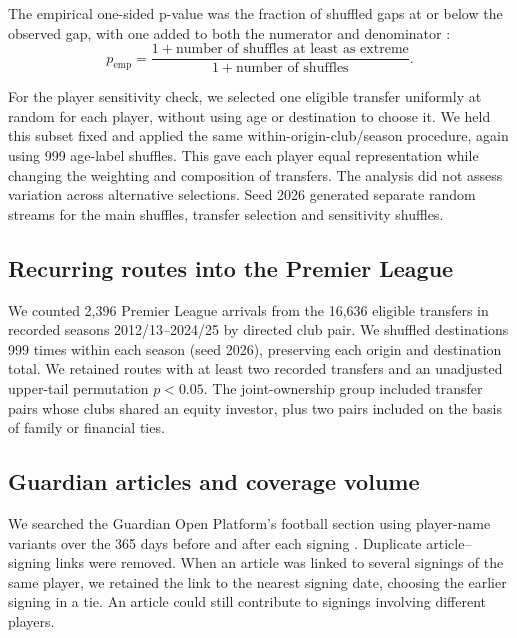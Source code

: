 The empirical one-sided p-value was the fraction of shuffled gaps at or below the observed gap, with one added to both the numerator and denominator \cite{hemerik2018exact,phipson2010permutation}:
\begin{equation}
p_{\mathrm{emp}} =
\frac{1+\text{number of shuffles at least as extreme}}
     {1+\text{number of shuffles}}.
\label{eq:h1-empirical-p}
\end{equation}

For the player sensitivity check, we selected one eligible transfer uniformly at random for each player, without using age or destination to choose it. We held this subset fixed and applied the same within-origin-club/season procedure, again using 999 age-label shuffles. This gave each player equal representation while changing the weighting and composition of transfers. The analysis did not assess variation across alternative selections. Seed 2026 generated separate random streams for the main shuffles, transfer selection and sensitivity shuffles.

\subsection*{Recurring routes into the Premier League}

We counted 2,396 Premier League arrivals from the 16,636 eligible transfers in recorded seasons 2012/13--2024/25 by directed club pair. We shuffled destinations 999 times within each season (seed 2026), preserving each origin and destination total. We retained routes with at least two recorded transfers and an unadjusted upper-tail permutation $p < 0.05$. The joint-ownership group included transfer pairs whose clubs shared an equity investor, plus two pairs included on the basis of family or financial ties.

\subsection*{Guardian articles and coverage volume}

We searched the Guardian Open Platform's football section using player-name variants over the 365 days before and after each signing \cite{guardian_api}. Duplicate article--signing links were removed. When an article was linked to several signings of the same player, we retained the link to the nearest signing date, choosing the earlier signing in a tie. An article could still contribute to signings involving different players.

